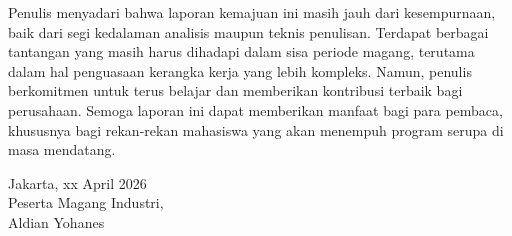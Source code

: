 Penulis menyadari bahwa laporan kemajuan ini masih jauh dari kesempurnaan, 
baik dari segi kedalaman analisis maupun teknis penulisan. Terdapat 
berbagai tantangan yang masih harus dihadapi dalam sisa periode magang,
terutama dalam hal penguasaan kerangka kerja yang lebih kompleks. 
Namun, penulis berkomitmen untuk terus belajar dan memberikan kontribusi
terbaik bagi perusahaan. Semoga laporan ini dapat memberikan manfaat 
bagi para pembaca, khususnya bagi rekan-rekan mahasiswa yang akan menempuh 
program serupa di masa mendatang.

\begin{flushright}
    Jakarta, xx April 2026\\
    Peserta Magang Industri,\\[1.5cm]
    Aldian Yohanes\\
\end{flushright}